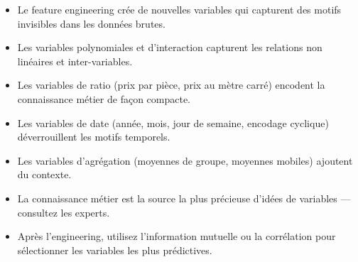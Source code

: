 \begin{itemize}
  \item Le feature engineering cr\'ee de nouvelles variables qui capturent des motifs invisibles dans les donn\'ees brutes.
  \item Les variables polynomiales et d'interaction capturent les relations non lin\'eaires et inter-variables.
  \item Les variables de ratio (prix par pi\`ece, prix au m\`etre carr\'e) encodent la connaissance m\'etier de fa\c{c}on compacte.
  \item Les variables de date (ann\'ee, mois, jour de semaine, encodage cyclique) d\'everrouillent les motifs temporels.
  \item Les variables d'agr\'egation (moyennes de groupe, moyennes mobiles) ajoutent du contexte.
  \item La connaissance m\'etier est la source la plus pr\'ecieuse d'id\'ees de variables --- consultez les experts.
  \item Apr\`es l'engineering, utilisez l'information mutuelle ou la corr\'elation pour s\'electionner les variables les plus pr\'edictives.
\end{itemize}
